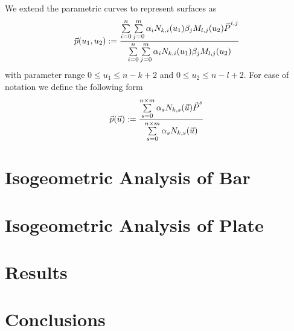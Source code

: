 \documentclass[submit,12pt]{aiaa-pretty} %
\begin{document}
We extend the parametric curves to represent surfaces as
\begin{equation}
  \vec{\mkern0mup}(u_1, u_2) := \dfrac{ {\sum\limits_{i=0}^{n} \sum\limits_{j=0}^{m} \alpha_i N_{k,i}(u_1) \beta_j M_{l,j}(u_2) \vec{\mkern0muP}^{i,j}}} {\sum\limits_{i=0}^{n} \sum\limits_{j=0}^{m} \alpha_i N_{k,i}(u_1) \beta_j M_{l,j}(u_2)}
\end{equation}
with parameter range $0 \le u_1 \le n - k + 2$ and $0 \le u_2 \le n - l + 2$. 
For ease of notation we define the following form
\begin{equation}
  \vec{\mkern0mup}(\vec{\mkern0muu}) := \dfrac{ {\sum \limits_{s=0}^{n \times m} \alpha_{s} N_{k,s}(\vec{\mkern0muu}) \vec{\mkern0muP}^{s}}} {\sum \limits_{s=0}^{n \times m} \alpha_{s} N_{k,s}(\vec{\mkern0muu})}
\end{equation}

\section{Isogeometric Analysis of Bar}
\section{Isogeometric Analysis of Plate}


\section{Results}

\section{Conclusions}
 
\end{document}
